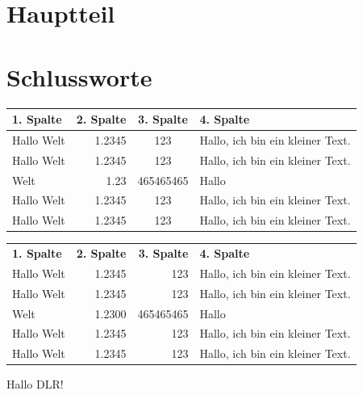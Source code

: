 \documentclass[12pt,ngerman,parskip=half]{scrreprt} %
\begin{document}
\blindtext

\blindtext

\section{Hauptteil}\label{sec:hauptteil}

\blindtext[1]


\section{Schlussworte}

\blindtext[10]

\begin{tabular}{|l|r|c|p{70mm}|} \hline
\textbf{1. Spalte} & \textbf{2. Spalte} & \textbf{3. Spalte} & \textbf{4. Spalte} \\ \hline \hline
Hallo Welt & 1.2345 & 123 & Hallo, ich bin ein kleiner Text. \\ \hline
Hallo Welt & 1.2345 & 123 & Hallo, ich bin ein kleiner Text. \\ \hline
Welt & 1.23 & 465465465 & Hallo \\ \hline
Hallo Welt & 1.2345 & 123 & Hallo, ich bin ein kleiner Text. \\ \hline
Hallo Welt & 1.2345 & 123 & Hallo, ich bin ein kleiner Text. \\ \hline
\end{tabular}\vspace*{2cm}

\begin{center}
\begin{tabular}{lrrp{60mm}} \toprule[2pt]
\textbf{1. Spalte} & \textbf{2. Spalte} & \textbf{3. Spalte} & \textbf{4. Spalte} \\ \cmidrule[1pt](rl){1-4}
Hallo Welt & 1.2345 & 123 & Hallo, ich bin ein kleiner Text. \\ 
Hallo Welt & 1.2345 & 123 & Hallo, ich bin ein kleiner Text. \\ 
Welt & 1.2300 & 465465465 & Hallo \\ 
Hallo Welt & 1.2345 & 123 & Hallo, ich bin ein kleiner Text. \\ 
Hallo Welt & 1.2345 & 123 & Hallo, ich bin ein kleiner Text. \\ \bottomrule
\end{tabular}
\end{center}

\begin{center}
\Large Hallo DLR!
\end{center}
\end{document}
